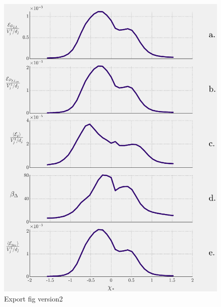 \documentclass{article}
\begin{document}
\begin{figure}
    \centering
    \includegraphics{figs/PG_4Hz_Diss_Splots_3.eps}
    \caption{Export fig version2}
    \label{dissplots3}
\end{figure}
\end{document}
